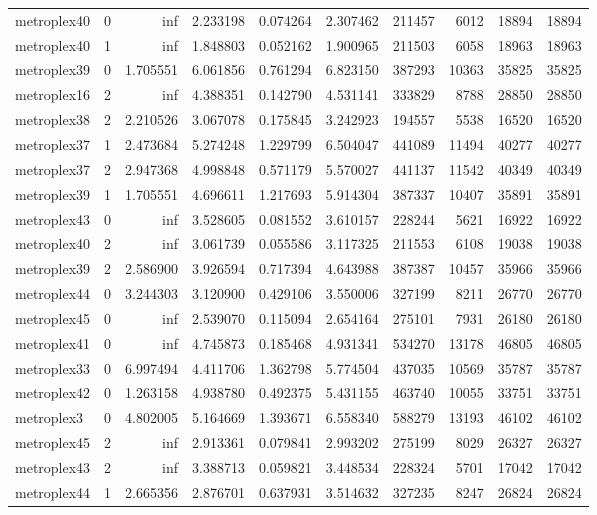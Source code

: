 \begin{longtable}{|l|r|r|r|r|r|r|r|r|r|}
metroplex40 & 0 & inf & 2.233198 & 0.074264 & 2.307462 & 211457 & 6012 & 18894 & 18894 \\
metroplex40 & 1 & inf & 1.848803 & 0.052162 & 1.900965 & 211503 & 6058 & 18963 & 18963 \\
metroplex39 & 0 & 1.705551 & 6.061856 & 0.761294 & 6.823150 & 387293 & 10363 & 35825 & 35825 \\
metroplex16 & 2 & inf & 4.388351 & 0.142790 & 4.531141 & 333829 & 8788 & 28850 & 28850 \\
metroplex38 & 2 & 2.210526 & 3.067078 & 0.175845 & 3.242923 & 194557 & 5538 & 16520 & 16520 \\
metroplex37 & 1 & 2.473684 & 5.274248 & 1.229799 & 6.504047 & 441089 & 11494 & 40277 & 40277 \\
metroplex37 & 2 & 2.947368 & 4.998848 & 0.571179 & 5.570027 & 441137 & 11542 & 40349 & 40349 \\
metroplex39 & 1 & 1.705551 & 4.696611 & 1.217693 & 5.914304 & 387337 & 10407 & 35891 & 35891 \\
metroplex43 & 0 & inf & 3.528605 & 0.081552 & 3.610157 & 228244 & 5621 & 16922 & 16922 \\
metroplex40 & 2 & inf & 3.061739 & 0.055586 & 3.117325 & 211553 & 6108 & 19038 & 19038 \\
metroplex39 & 2 & 2.586900 & 3.926594 & 0.717394 & 4.643988 & 387387 & 10457 & 35966 & 35966 \\
metroplex44 & 0 & 3.244303 & 3.120900 & 0.429106 & 3.550006 & 327199 & 8211 & 26770 & 26770 \\
metroplex45 & 0 & inf & 2.539070 & 0.115094 & 2.654164 & 275101 & 7931 & 26180 & 26180 \\
metroplex41 & 0 & inf & 4.745873 & 0.185468 & 4.931341 & 534270 & 13178 & 46805 & 46805 \\
metroplex33 & 0 & 6.997494 & 4.411706 & 1.362798 & 5.774504 & 437035 & 10569 & 35787 & 35787 \\
metroplex42 & 0 & 1.263158 & 4.938780 & 0.492375 & 5.431155 & 463740 & 10055 & 33751 & 33751 \\
metroplex3 & 0 & 4.802005 & 5.164669 & 1.393671 & 6.558340 & 588279 & 13193 & 46102 & 46102 \\
metroplex45 & 2 & inf & 2.913361 & 0.079841 & 2.993202 & 275199 & 8029 & 26327 & 26327 \\
metroplex43 & 2 & inf & 3.388713 & 0.059821 & 3.448534 & 228324 & 5701 & 17042 & 17042 \\
metroplex44 & 1 & 2.665356 & 2.876701 & 0.637931 & 3.514632 & 327235 & 8247 & 26824 & 26824 \\

\end{longtable}

